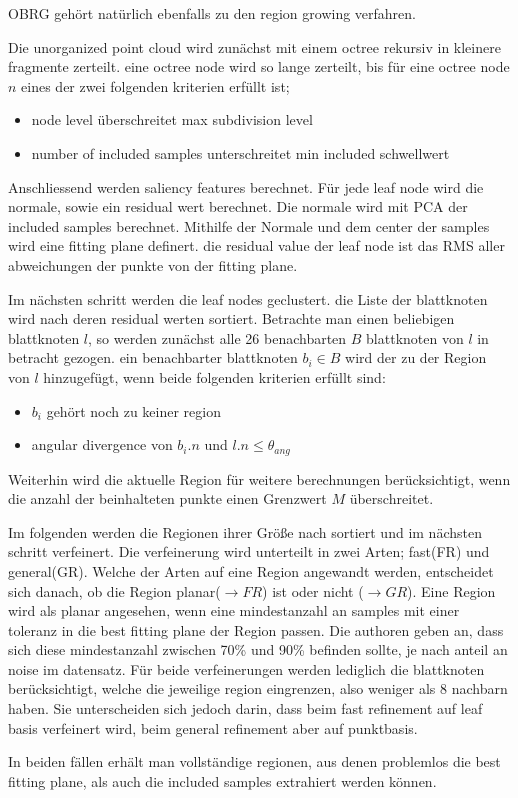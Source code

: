 \documentclass[main.tex]{subfiles}
\begin{document}
OBRG gehört natürlich ebenfalls zu den region growing verfahren.

Die unorganized point cloud wird zunächst mit einem octree rekursiv in kleinere fragmente zerteilt. eine octree node wird so lange zerteilt, bis für eine octree node $n$ eines der zwei folgenden kriterien erfüllt ist;
\begin{itemize}
    \item node level überschreitet max subdivision level
    \item number of included samples unterschreitet min included schwellwert
\end{itemize}

Anschliessend werden saliency features berechnet. Für jede leaf node wird die normale, sowie ein residual wert berechnet. Die normale wird mit PCA der included samples berechnet.
Mithilfe der Normale und dem center der samples wird eine fitting plane definert. die residual value der leaf node ist das RMS aller abweichungen der punkte von der fitting plane.

Im nächsten schritt werden die leaf nodes geclustert. die Liste der blattknoten wird nach deren residual werten sortiert. Betrachte man einen beliebigen blattknoten $l$, so werden zunächst alle 26 benachbarten $B$ blattknoten von $l$ in betracht gezogen.
ein benachbarter blattknoten $b_i \in B$ wird der zu der Region von $l$ hinzugefügt, wenn beide folgenden kriterien erfüllt sind:
\begin{itemize}
    \item $b_i$ gehört noch zu keiner region
    \item angular divergence von $b_i.n$ und $l.n \leq \theta_{ang}$
\end{itemize}

Weiterhin wird die aktuelle Region für weitere berechnungen berücksichtigt, wenn die anzahl der beinhalteten punkte einen Grenzwert $M$ überschreitet.

Im folgenden werden die Regionen ihrer Größe nach sortiert und im nächsten schritt verfeinert.
Die verfeinerung wird unterteilt in zwei Arten; fast(FR) und general(GR). Welche der Arten auf eine Region angewandt werden, entscheidet sich danach, ob die Region planar($\rightarrow FR$) ist oder nicht ($\rightarrow GR$).
Eine Region wird als planar angesehen, wenn eine mindestanzahl an samples mit einer toleranz in die best
fitting plane der Region passen. Die authoren geben an, dass sich diese mindestanzahl zwischen 70\% und 90\% befinden sollte, je nach anteil an noise im datensatz.
Für beide verfeinerungen werden lediglich die blattknoten berücksichtigt, welche die jeweilige region eingrenzen, also weniger als 8 nachbarn haben. Sie unterscheiden sich jedoch darin, dass beim fast refinement auf leaf basis verfeinert wird, beim general refinement
aber auf punktbasis.

In beiden fällen erhält man vollständige regionen, aus denen problemlos die best fitting plane, als auch die included samples extrahiert werden können.
\end{document}
